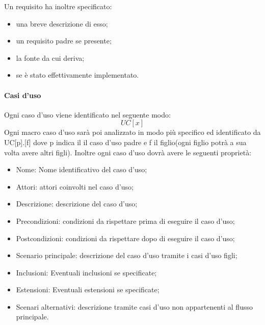 				Un requisito ha inoltre specificato:
				\begin{itemize}
					\item una breve descrizione di esso;
					\item un requisito padre se presente;
					\item la fonte da cui deriva;
					\item se è stato effettivamente implementato.
				\end{itemize}
			\paragraph{Casi d'uso}
				Ogni caso d'uso viene identificato nel seguente modo:
				\begin{equation}
					UC[x]
				\end{equation}
				Ogni macro caso d'uso sarà poi analizzato in modo più specifico ed identificato da UC[p].[f] dove p indica il il caso d'uso padre e f il figlio(ogni figlio potrà a sua volta avere altri figli).
				Inoltre ogni caso d'uso dovrà avere le seguenti proprietà:
				\begin{itemize}
					\item Nome: Nome identificativo del caso d'uso;
					\item Attori: attori coinvolti nel caso d'uso;
					\item Descrizione: descrizione del caso d'uso;
					\item Precondizioni: condizioni da rispettare prima di eseguire il caso d'uso;%
					\item Postcondizioni: condizioni da rispettare dopo di eseguire il caso d'uso;%
					\item Scenario principale: descrizione del caso d'uso tramite i casi d'uso figli;
					\item Inclusioni: Eventuali inclusioni se specificate;
					\item Estensioni: Eventuali estensioni se specificate;
					\item Scenari alternativi: descrizione tramite casi d'uso non appartenenti al flusso principale.
				\end{itemize}
